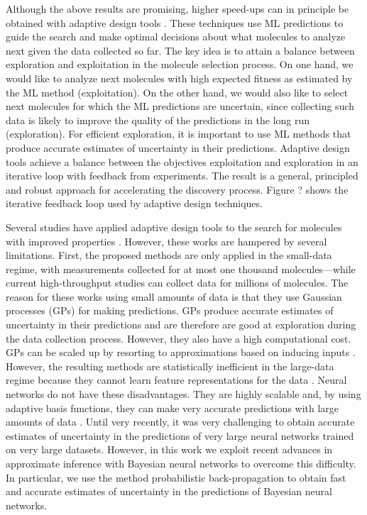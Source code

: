 Although the above results are promising, higher speed-ups can in principle be
obtained with adaptive design tools \cite{jones1998efficient}. These techniques
use ML predictions to guide the search and make optimal decisions about what
molecules to analyze next given the data collected so far. The key idea is to
attain a balance between exploration and exploitation in the molecule selection
process. On one hand, we would like to analyze next molecules with high
expected fitness as estimated by the ML method (exploitation). On the other
hand, we would also like to select next molecules for which the ML predictions
are uncertain, since collecting such data is likely to improve the quality of
the predictions in the long run (exploration). For efficient
exploration, it is important to use ML methods that produce accurate
estimates of uncertainty in their predictions. 
Adaptive design tools achieve a balance
between the objectives exploitation and exploration in an iterative loop with
feedback from experiments. 
The result is a general, principled and robust
approach for accelerating the discovery process. 
Figure ? shows the iterative
feedback loop used by adaptive design techniques.

Several studies have applied adaptive design tools to the search for
molecules with improved properties \cite{Xue_2016,Negoescu_2011,De_Grave_2008}. However, these
works are hampered by several limitations. First, the proposed methods are only
applied in the small-data regime, with measurements collected for at most one
thousand molecules---while current high-throughput studies can collect data for
millions of molecules. The reason for these works using small amounts of data is that they
use Gaussian processes (GPs) \cite{rasmussen2006gaussian} for making predictions. GPs
produce accurate estimates of uncertainty in their predictions and are therefore
are good at exploration during the data collection process.
However, they also have a high computational
cost. GPs can be scaled up by resorting to approximations based on inducing inputs 
\cite{snelson2005sparse,hensman2015scalable}. However, the resulting methods are
statistically inefficient in the large-data regime because they cannot learn
feature representations for the data \cite{bengio2007scaling}.
Neural networks do not have these disadvantages. They are highly scalable and,
by using adaptive basis functions, they can make very accurate predictions with
large amounts of data \cite{lecun2015deep}. Until very recently, it was very
challenging to obtain accurate estimates of uncertainty in the predictions of very large
neural networks trained on very large datasets. However, in this work we exploit
recent advances in approximate inference with Bayesian neural networks to overcome this difficulty. 
In particular, we use the method probabilistic back-propagation \cite{Hernandez-Lobato15b} to obtain fast
and accurate estimates of uncertainty in the predictions of Bayesian neural networks.

